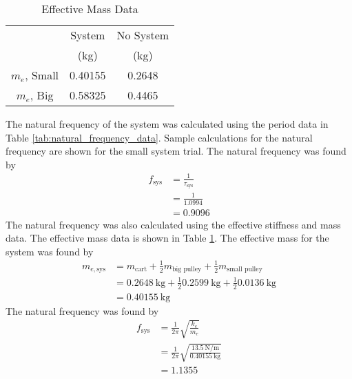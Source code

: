\begin{table}[H]
    \centering
    \caption{Effective Mass Data}
    \label{tab:effective_stiffness_mass}
    \begin{tabular}{ccc}
    \toprule
        & System & No System \\
        & (kg) & (kg) \\
        \midrule
        $m_e$, Small & 0.40155 & 0.2648 \\
        $m_e$, Big & 0.58325 & 0.4465 \\
        \bottomrule
    \end{tabular}
\end{table}
The natural frequency of the system was calculated using the period data in Table \ref{tab:natural_frequency_data}. Sample calculations for the natural frequency are shown for the small system trial. The natural frequency was found by
\begin{align*}
    f_{\text{sys}} &= \frac{1}{\tau_{\text{sys}}} \\
    &= \frac{1}{1.0994} \\
    &= \boxed{0.9096}
\end{align*}
The natural frequency was also calculated using the effective stiffness and mass data. The effective mass data is shown in Table \ref{tab:effective_stiffness_mass}. The effective mass for the system was found by 
\begin{align*}
    m_{e, \text{sys}} &= m_{\text{cart}} + \frac{1}{2} m_{\text{big pulley}} + \frac{1}{2} m_{\text{small pulley}} \\
    &= \qty{0.2648}{\kilo\gram} + \frac{1}{2} \qty{0.2599}{\kilo\gram} + \frac{1}{2} \qty{0.0136}{\kilo\gram} \\
    &= \qty{0.40155}{\kilo\gram}
\end{align*}
The natural frequency was found by 
\begin{align*}
    f_{\text{sys}} &= \frac{1}{2\pi} \sqrt{\frac{k_e}{m_e}} \\
    &= \frac{1}{2\pi} \sqrt{\frac{\qty{13.5}{\newton\per\meter}}{\qty{0.40155}{\kilo\gram}}} \\
    &= \boxed{1.1355}
\end{align*}
